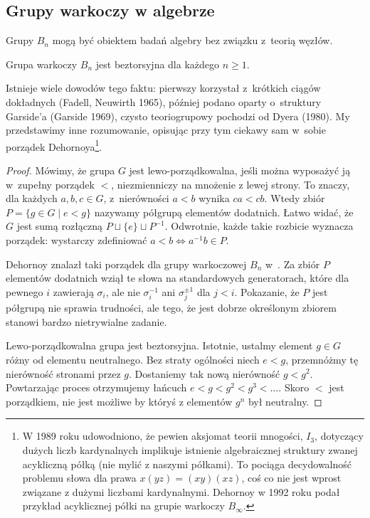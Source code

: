 \subsection{Grupy warkoczy w algebrze}
Grupy $B_n$ mogą być obiektem badań algebry bez związku z~teorią węzłów.

\begin{proposition}
    Grupa warkoczy $B_n$ jest beztorsyjna dla każdego $n \ge 1$.
\end{proposition}

Istnieje wiele dowodów tego faktu: pierwszy korzystał z~krótkich ciągów dokładnych (Fadell, Neuwirth 1965), później podano oparty o~struktury Garside'a (Garside 1969), czysto teoriogrupowy pochodzi od Dyera (1980).
%
%
%
%
My przedstawimy inne rozumowanie, opisując przy tym ciekawy sam w~sobie porządek Dehornoya\footnote{W 1989 roku udowodniono, że pewien aksjomat teorii mnogości, $I_3$, dotyczący dużych liczb kardynalnych implikuje istnienie algebraicznej struktury zwanej acykliczną półką (nie mylić z naszymi półkami).
To pociąga decydowalność problemu słowa dla prawa $x(yz) = (xy)(xz)$, coś co nie jest wprost związane z dużymi liczbami kardynalnymi.
Dehornoy w 1992 roku podał przykład acyklicznej półki na grupie warkoczy $B_\infty$.}.%
%

\begin{proof}
%
    Mówimy, że grupa $G$ jest lewo-porządkowalna, jeśli można wyposażyć ją w~zupełny porządek $<$, niezmienniczy na mnożenie z lewej strony.
    To znaczy, dla każdych $a, b, c \in G$, z~nierówności $a < b$ wynika $ca < cb$.
    Wtedy zbiór $P = \{g \in G \mid e < g\}$ nazywamy półgrupą elementów dodatnich.
    Łatwo widać, że $G$ jest sumą rozłączną $P \sqcup \{e\} \sqcup P^{-1}$.
    Odwrotnie, każde takie rozbicie wyznacza porządek: wystarczy zdefiniować $a < b \iff a^{-1}b \in P$.

    Dehornoy znalazł taki porządek dla grupy warkoczowej $B_n$ w~\cite{dehornoy94}.
    Za zbiór $P$ elementów dodatnich wziął te słowa na standardowych generatorach, które dla pewnego $i$ zawierają $\sigma_i$, ale nie $\sigma_i^{-1}$ ani $\sigma_j^{\pm 1}$ dla $j < i$.
    Pokazanie, że $P$ jest półgrupą nie sprawia trudności, ale tego, że jest dobrze określonym zbiorem stanowi bardzo nietrywialne zadanie.

    Lewo-porządkowalna grupa jest beztorsyjna.
    Istotnie, ustalmy element $g \in G$ różny od elementu neutralnego.
    Bez straty ogólności niech $e < g$, przemnóżmy tę nierówność stronami przez $g$.
    Dostaniemy tak nową nierówność $g < g^2$.
    Powtarzając proces otrzymujemy łańcuch $e < g < g^2 < g^3 < \ldots$.
    Skoro $<$ jest porządkiem, nie jest możliwe by któryś z elementów $g^n$ był neutralny.
\end{proof}

